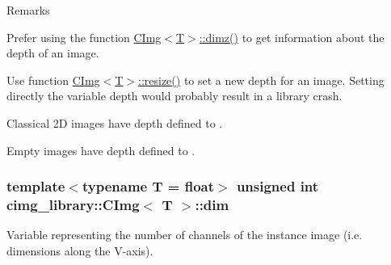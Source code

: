 \begin{DoxyRemark}{Remarks}

\begin{DoxyItemize}
\item Prefer using the function \hyperlink{structcimg__library_1_1_c_img_aba56e96a615d71ed9a71009768fc4b75}{C\-Img$<$\-T$>$\-::dimz()} to get information about the depth of an image.
\item Use function \hyperlink{structcimg__library_1_1_c_img_a84970d569f01fc5f9370d9cc84428903}{C\-Img$<$\-T$>$\-::resize()} to set a new depth for an image. Setting directly the variable {\ttfamily depth} would probably result in a library crash.
\item Classical 2\-D images have {\ttfamily depth} defined to {}.
\item Empty images have {\ttfamily depth} defined to {}. 
\end{DoxyItemize}
\end{DoxyRemark}
\hypertarget{structcimg__library_1_1_c_img_ac9648dfe0a26d58e6e0030a3dbca234e}{
\subsubsection[{dim}]{\setlength{\rightskip}{0pt plus 5cm}template$<$typename T = float$>$ unsigned int {\bf cimg\-\_\-library\-::\-C\-Img}$<$ T $>$\-::dim}}\label{structcimg__library_1_1_c_img_ac9648dfe0a26d58e6e0030a3dbca234e}


Variable representing the number of channels of the instance image (i.\-e. dimensions along the V-\/axis). 

